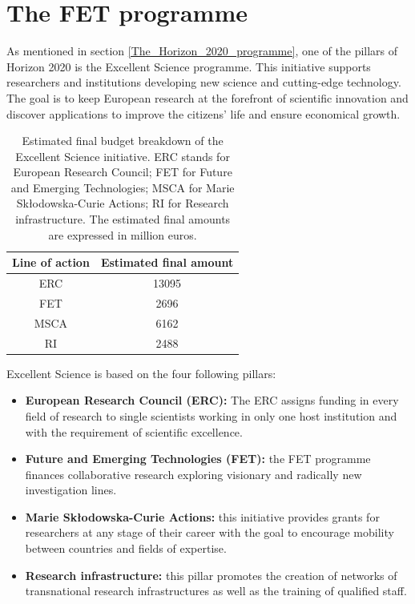 \section{The FET programme} 
As mentioned in section \ref{The_Horizon_2020_programme}, one of the pillars of Horizon 2020 is the Excellent Science programme. This initiative supports researchers and institutions developing new science and cutting-edge technology. The goal is to keep European research at the forefront of scientific innovation and discover applications to improve the citizens' life and ensure economical growth.  

\begin{table}[t]
 \begin{center}
  \begin{tabular}{cc}
   \hline 
   \hline
   Line of action & Estimated final amount \\ 
   \hline
   \hline
   ERC & 13095 \\
   FET & 2696 \\
   MSCA & 6162 \\
   RI & 2488 \\
   \hline
   \hline
  \end{tabular}
 \end{center} 
 \caption{Estimated final budget breakdown of the Excellent Science initiative. ERC stands for European Research Council; FET for Future and Emerging Technologies; MSCA for Marie Sk\l{}odowska-Curie Actions; RI for Research infrastructure. The estimated final amounts are expressed in million euros.}
\label{FET_budget_breakdown} 
\end{table}

Excellent Science is based on the four following pillars: 

\begin{itemize}
 \item \textbf{European Research Council (ERC):} The ERC assigns funding in every field of research to single scientists working in only one host institution and with the requirement of scientific excellence.  
 \item \textbf{Future and Emerging Technologies (FET):} the FET programme finances collaborative research exploring visionary and radically new investigation lines. 
 \item \textbf{Marie Sk\l{}odowska-Curie Actions:} this initiative provides grants for researchers at any stage of their career with the goal to encourage mobility between countries and fields of expertise. 
 \item \textbf{Research infrastructure:} this pillar promotes the creation of networks of transnational research infrastructures as well as the training of qualified staff. 
\end{itemize}

